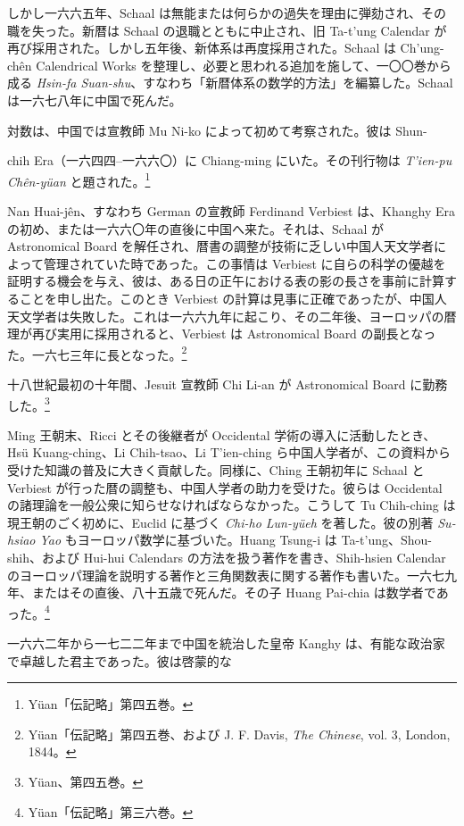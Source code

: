 \documentclass[11pt]{article}
\newcommand{\scanpage}[2]{\clearpage\setcounter{footnote}{0}\noindent{\footnotesize\color{gray}PDF #1 頁 · #2}\par\medskip}
\newcommand{\scanfooter}{}
\begin{document}
しかし一六六五年、Schaal は無能または何らかの過失を理由に弾劾され、その職を失った。新暦は Schaal の退職とともに中止され、旧 Ta-t'ung Calendar が再び採用された。しかし五年後、新体系は再度採用された。Schaal は Ch'ung-chên Calendrical Works を整理し、必要と思われる追加を施して、一〇〇巻から成る \emph{Hsin-fa Suan-shu}、すなわち「新暦体系の数学的方法」を編纂した。Schaal は一六七八年に中国で死んだ。

対数は、中国では宣教師 Mu Ni-ko によって初めて考察された。彼は Shun-
\scanfooter

\scanpage{0130}{第17章、印刷頁116}
\setcounter{footnote}{0}
chih Era（一六四四--一六六〇）に Chiang-ming にいた。その刊行物は \emph{T'ien-pu Chên-yüan} と題された。\footnote{Yüan「伝記略」第四五巻。}

Nan Huai-jên、すなわち German の宣教師 Ferdinand Verbiest は、Khanghy Era の初め、または一六六〇年の直後に中国へ来た。それは、Schaal が Astronomical Board を解任され、暦書の調整が技術に乏しい中国人天文学者によって管理されていた時であった。この事情は Verbiest に自らの科学の優越を証明する機会を与え、彼は、ある日の正午における表の影の長さを事前に計算することを申し出た。このとき Verbiest の計算は見事に正確であったが、中国人天文学者は失敗した。これは一六六九年に起こり、その二年後、ヨーロッパの暦理が再び実用に採用されると、Verbiest は Astronomical Board の副長となった。一六七三年に長となった。\footnote{Yüan「伝記略」第四五巻、および J. F. Davis, \emph{The Chinese}, vol. 3, London, 1844。}

十八世紀最初の十年間、Jesuit 宣教師 Chi Li-an が Astronomical Board に勤務した。\footnote{Yüan、第四五巻。}

Ming 王朝末、Ricci とその後継者が Occidental 学術の導入に活動したとき、Hsü Kuang-ching、Li Chih-tsao、Li T'ien-ching ら中国人学者が、この資料から受けた知識の普及に大きく貢献した。同様に、Ching 王朝初年に Schaal と Verbiest が行った暦の調整も、中国人学者の助力を受けた。彼らは Occidental の諸理論を一般公衆に知らせなければならなかった。こうして Tu Chih-ching は現王朝のごく初めに、Euclid に基づく \emph{Chi-ho Lun-yüeh} を著した。彼の別著 \emph{Su-hsiao Yao} もヨーロッパ数学に基づいた。Huang Tsung-i は Ta-t'ung、Shou-shih、および Hui-hui Calendars の方法を扱う著作を書き、Shih-hsien Calendar のヨーロッパ理論を説明する著作と三角関数表に関する著作も書いた。一六七九年、またはその直後、八十五歳で死んだ。その子 Huang Pai-chia は数学者であった。\footnote{Yüan「伝記略」第三六巻。}

一六六二年から一七二二年まで中国を統治した皇帝 Kanghy は、有能な政治家で卓越した君主であった。彼は啓蒙的な
\scanfooter
\end{document}
